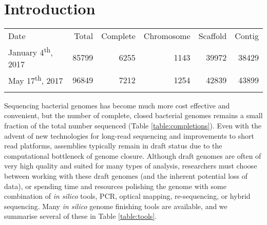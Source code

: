 \documentclass[a4,center,fleqn]{NAR}
\begin{document}
\section{Introduction}
\begin{table*}[!th]
  \centering
  \caption{NCBI Genome Assemblies of Bacteria}
  \label{table:completions}
  \begin{tabular}{lrrrrr}
    \toprule
    Date & Total & Complete & Chromosome & Scaffold & Contig \\
    \colrule
    January 4\textsuperscript{th}, 2017 & 85799 & 6255 & 1143 & 39972 & 38429  \\
    May 17\textsuperscript{th}, 2017 & 96849 & 7212 & 1254 & 42839 & 43899\\
    \botrule
    \multicolumn{3}{l}{\tiny Source: \url{https://www.ncbi.nlm.nih.gov/genome/browse/}}
  \end{tabular}
\end{table*}
Sequencing bacterial genomes has become much more cost effective and convenient, but the number of complete, closed bacterial genomes remains a small fraction of the total number sequenced (Table \ref{table:completions}). Even with the advent of new technologies for long-read sequencing and improvements to short read platforms, assemblies typically remain in draft status due to the computational bottleneck of genome closure\cite{Nagarajan2010,Brouwer2016}. Although draft genomes are often of very high quality and suited for many types of analysis, researchers must choose between working with these draft genomes (and the inherent potential loss of data), or spending time and resources polishing the genome with some combination of \textit{in silico} tools, PCR, optical mapping, re-sequencing, or hybrid sequencing\cite{Nagarajan2010,Utturkar2014}. Many \textit{in silico} genome finishing tools are available, and we summarise several of these in Table \ref{table:tools}.

\enlargethispage{-65.1pt}
\end{document}

